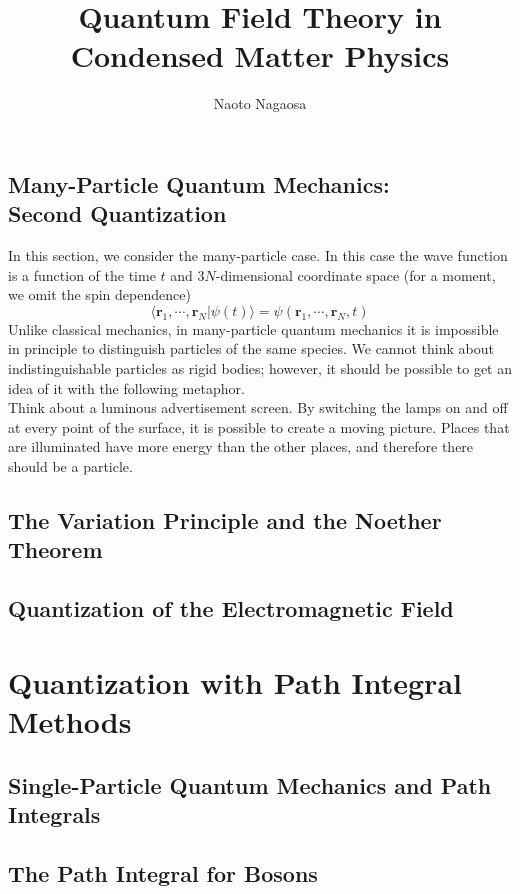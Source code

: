 \documentclass[twoside,11pt]{report}
\title{Quantum Field Theory in Condensed Matter Physics}
\author{Naoto Nagaosa}
\def\be{\begin{equation}}
\def\ee{\end{equation}}
\begin{document}
\maketitle
\tableofcontents
\setcounter{page}{0}



\section[Many-Particle Quantum Mechanics: Second Quantization]{Many-Particle Quantum Mechanics: \\ Second Quantization}

In this section, we consider the many-particle case. In this case the wave function is a function of the time $t$ and $3N$-dimensional coordinate space (for a moment, we omit the spin dependence)
\be
\langle\bm r_1,\cdots,\bm r_N|\psi(t)\rangle=\psi(\bm r_1,\cdots,\bm r_N,t)
\ee
Unlike classical mechanics, in many-particle quantum mechanics it is impossible in principle to distinguish particles of the same species. We cannot think about indistinguishable particles as rigid bodies; however, it should be possible to get an idea of it with the following metaphor. \\
\indent Think about a luminous advertisement screen. By switching the lamps on and off at every point of the surface, it is possible to create a moving picture. Places that are illuminated have more energy than the other places, and therefore there should be a particle. 

\section{The Variation Principle and the Noether Theorem}
\section{Quantization of the Electromagnetic Field}

\chapter{Quantization with Path Integral Methods}
\section{Single-Particle Quantum Mechanics and Path Integrals}
\section{The Path Integral for Bosons}
\end{document}
